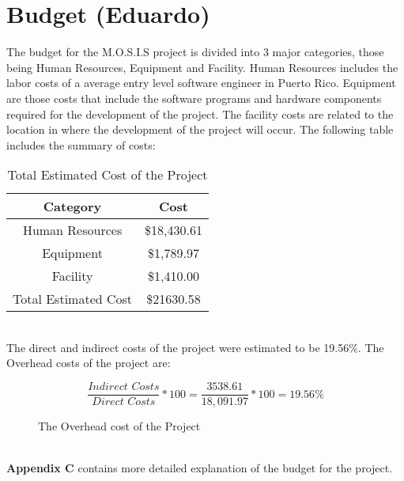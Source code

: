 
 \section{Budget (Eduardo)}
 The budget for the M.O.S.I.S project is divided into 3 major categories, those being Human Resources, Equipment and Facility. Human Resources includes the labor costs of a average entry level software engineer in Puerto Rico\cite{SoftwareEngineerSalary}. Equipment are those costs that include the software programs and hardware components required for the development of the project. The facility costs are related to the location in where the development of the project will occur. The following table includes the summary of costs:
 \begin{table}[h]
    \centering
    \begin{tabular}{||c | c||} 
     \hline
     Category & Cost \\ [0.5ex] 
     \hline\hline
     Human Resources & \$18,430.61\\ 
     \hline
     Equipment & \$1,789.97\\
     \hline
     Facility & \$1,410.00\\
     \hline
     Total Estimated Cost & \$21630.58 \\
     \hline
    \end{tabular}
    \caption {Total Estimated Cost of the Project}
    \label {table:1}
\end{table}
\\ The direct and indirect costs of the project were estimated to be 19.56\%. The Overhead costs of the project are:
\begin{figure}[h]
   $$\frac{\textit{Indirect Costs}}{\textit{Direct Costs}} * 100 = \frac{3538.61}{18,091.97} * 100 = 19.56\%$$
\caption{The Overhead cost of the Project}
\end{figure}
\\\textbf{Appendix C} contains more detailed explanation of the budget for the project.